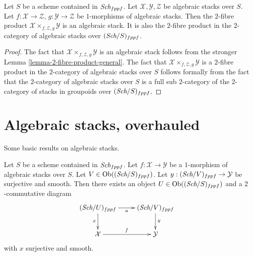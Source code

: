 \begin{lemma}
\label{lemma-2-fibre-product}
Let $S$ be a scheme contained in $\textit{Sch}_{fppf}$.
Let $\mathcal{X}, \mathcal{Y}, \mathcal{Z}$ be algebraic stacks over $S$.
Let $f : \mathcal{X} \to \mathcal{Z}$, $g : \mathcal{Y} \to \mathcal{Z}$
be $1$-morphisms of algebraic stacks. Then the $2$-fibre product
$\mathcal{X} \times_{f, \mathcal{Z}, g} \mathcal{Y}$ is an algebraic stack.
It is also the $2$-fibre product in the $2$-category of algebraic stacks
over $(\textit{Sch}/S)_{fppf}$.
\end{lemma}

\begin{proof}
The fact that $\mathcal{X} \times_{f, \mathcal{Z}, g} \mathcal{Y}$ is an
algebraic stack follows from the stronger
Lemma \ref{lemma-2-fibre-product-general}.
The fact that $\mathcal{X} \times_{f, \mathcal{Z}, g} \mathcal{Y}$
is a $2$-fibre product in the $2$-category of algebraic stacks over $S$
follows formally from the fact that the $2$-category of algebraic stacks
over $S$ is a full sub $2$-category of the $2$-category of stacks in
groupoids over $(\textit{Sch}/S)_{fppf}$.
\end{proof}







\section{Algebraic stacks, overhauled}
\label{section-overhaul}

\noindent
Some basic results on algebraic stacks.

\begin{lemma}
\label{lemma-lift-morphism-presentations}
Let $S$ be a scheme contained in $\textit{Sch}_{fppf}$.
Let $f : \mathcal{X} \to \mathcal{Y}$ be a $1$-morphism of algebraic
stacks over $S$.
Let $V \in \text{Ob}((\textit{Sch}/S)_{fppf})$.
Let $y : (\textit{Sch}/V)_{fppf} \to \mathcal{Y}$ be surjective and smooth.
Then there exists an object $U \in \text{Ob}((\textit{Sch}/S)_{fppf})$
and a $2$-commutative diagram
$$
\xymatrix{
(\Sch/U)_{fppf} \ar[r]_a \ar[d]_x &
(\Sch/V)_{fppf} \ar[d]^y \\
\mathcal{X} \ar[r]^f & \mathcal{Y}
}
$$
with $x$ surjective and smooth.
\end{lemma}

